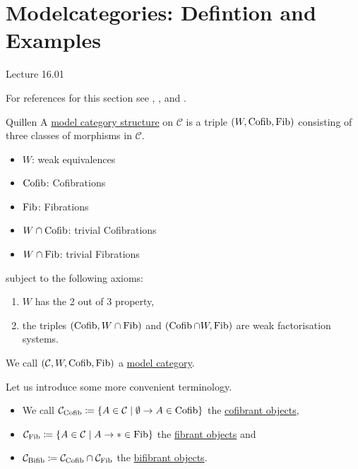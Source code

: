 \section{Modelcategories: Defintion and Examples}

Lecture 16.01

For references for this section see \cite[Section 2.2]{Cisinski_2019}, \cite[Section I.11]{GoerSimp1999}, \cite[Section 3.3.7]{kerodon} and \cite[Chapter 3]{Model_category_Hovey}.

\begin{defi}{Quillen}
    A \underline{model category structure} on $\mathcal{C}$ is a triple $(W, \operatorname{Cofib}, \operatorname{Fib})$ consisting of three classes of morphisms in $\mathcal{C}$.
    \begin{itemize}[label={}]
        \item 
        $W$: weak equivalences
        \item 
        $\operatorname{Cofib}$: Cofibrations
        \item  
        $\operatorname{Fib}$: Fibrations
        \item 
        $W \cap \operatorname{Cofib}$: trivial Cofibrations
        \item 
        $W \cap \operatorname{Fib}$: trivial Fibrations
    \end{itemize}
    subject to the following axioms:
    \begin{enumerate}
        \item 
        $W$ has the 2 out of 3 property,
        \item
        the triples $(\operatorname{Cofib}, W \cap \operatorname{Fib})$ and $( \operatorname{Cofib} \cap W, \operatorname{Fib})$ are weak factorisation systems.
    \end{enumerate}
    We call $(\mathcal{C}, W, \operatorname{Cofib}, \operatorname{Fib} )$ a \underline{model category}.
\end{defi}

\begin{rmk}
    Let us introduce some more convenient terminology.
    \begin{itemize}
        \item 
        We call $\mathcal{C}_{\operatorname{Cofib}} \coloneqq \{ A \in \mathcal{C} \mid \emptyset \to A \in \operatorname{Cofib}\}$ the \underline{cofibrant objects},
        \item 
        $\mathcal{C}_{\operatorname{Fib}} \coloneqq \{ A \in \mathcal{C} \mid A \to * \in \operatorname{Fib}\}$ the \underline{fibrant objects} and 
        \item   
        $\mathcal{C}_{\operatorname{Bifib}} \coloneqq \mathcal{C}_{\operatorname{Cofib}} \cap \mathcal{C}_{\operatorname{Fib}}$ the \underline{bifibrant objects}.
    \end{itemize}
\end{rmk}

